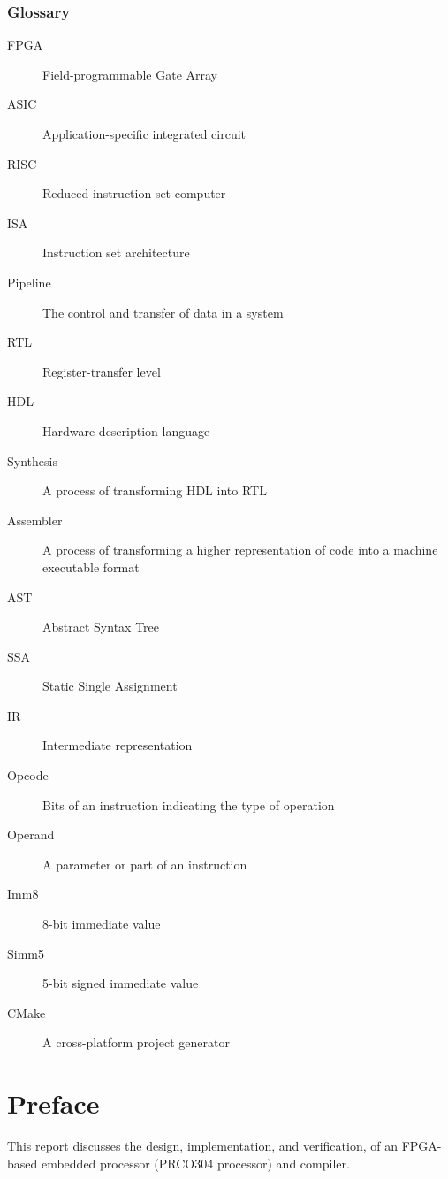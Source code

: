 \documentclass[11pt,a4paper]{report}
\newcommand{\scname}{PRCO304}
\begin{document}
\subsection*{Glossary}
\begin{description}
\item[FPGA]{Field-programmable Gate Array}
\item[ASIC]{Application-specific integrated circuit}
\item[RISC]{Reduced instruction set computer}
\item[ISA]{Instruction set architecture}
\item[Pipeline]{The control and transfer of data in a system}
\item[RTL]{Register-transfer level}
\item[HDL]{Hardware description language}
\item[Synthesis]{A process of transforming HDL into RTL}
\item[Assembler]{A process of transforming a higher representation of code into a machine executable format}
\item[AST]{Abstract Syntax Tree}
\item[SSA]{Static Single Assignment}
\item[IR]{Intermediate representation}
\item[Opcode]{Bits of an instruction indicating the type of operation}
\item[Operand]{A parameter or part of an instruction}
\item[Imm8]{8-bit immediate value}
\item[Simm5]{5-bit signed immediate value}
\item[CMake]{A cross-platform project generator}
\end{description}

\newpage
\chapter*{Preface}
\label{sect:preface}
This report discusses the design, implementation, and verification, of an FPGA-based embedded processor (\scname{} processor) and compiler.
\end{document}
